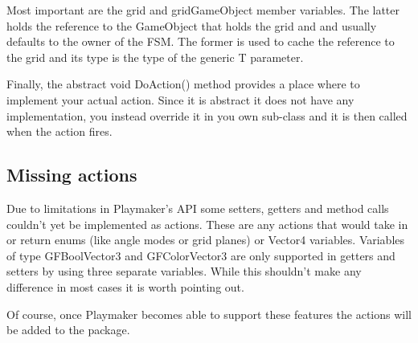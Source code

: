 Most important are the {\ttfamily grid} and {\ttfamily grid\+Game\+Object} member variables. The latter holds the reference to the Game\+Object that holds the grid and and usually defaults to the owner of the F\+S\+M. The former is used to cache the reference to the grid and its type is the type of the generic {\ttfamily T} parameter.

Finally, the {\ttfamily abstract void Do\+Action()} method provides a place where to implement your actual action. Since it is abstract it does not have any implementation, you instead override it in you own sub-\/class and it is then called when the action fires.

\subsection*{Missing actions }

Due to limitations in Playmaker's A\+P\+I some setters, getters and method calls couldn't yet be implemented as actions. These are any actions that would take in or return enums (like angle modes or grid planes) or Vector4 variables. Variables of type {\ttfamily G\+F\+Bool\+Vector3} and {\ttfamily G\+F\+Color\+Vector3} are only supported in getters and setters by using three separate variables. While this shouldn't make any difference in most cases it is worth pointing out.

Of course, once Playmaker becomes able to support these features the actions will be added to the package. 